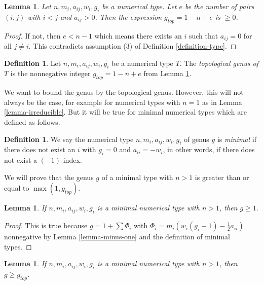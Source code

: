 \documentclass[10pt,a4paper]{amsart}
\theoremstyle{plain}
\newtheorem{lemma}[subsection]{Lemma}
\theoremstyle{definition}
\newtheorem{definition}[subsection]{Definition}
\theoremstyle{remark}
\numberwithin{equation}{subsection}
\begin{document}
\begin{lemma}
\label{lemma-top-genus}
Let $n, m_i, a_{ij}, w_i, g_i$ be a numerical type.
Let $e$ be the number of pairs $(i, j)$ with $i < j$ and $a_{ij} > 0$.
Then the expression $g_{top} = 1 - n + e$ is $\geq 0$.
\end{lemma}

\begin{proof}
If not, then $e < n - 1$ which means there exists an $i$ such that
$a_{ij} = 0$ for all $j \not = i$. This contradicts assumption
(3) of Definition \ref{definition-type}.
\end{proof}

\begin{definition}
\label{definition-top-genus}
Let $n, m_i, a_{ij}, w_i, g_i$ be a numerical type $T$. The
{\it topological genus of $T$} is the nonnegative integer
$g_{top} = 1 - n + e$ from Lemma \ref{lemma-top-genus}.
\end{definition}

\noindent
We want to bound the genus by the topological genus. However, this
will not always be the case, for example for numerical types
with $n = 1$ as in Lemma \ref{lemma-irreducible}. But it will
be true for minimal numerical types which are defined as follows.

\begin{definition}
\label{definition-type-minimal}
We say the numerical type $n, m_i, a_{ij}, w_i, g_i$ of genus $g$
is {\it minimal} if there does not exist an $i$
with $g_i = 0$ and $a_{ii} = -w_i$, in other words, if there
does not exist a $(-1)$-index.
\end{definition}

\noindent
We will prove that the genus $g$ of a minimal type with $n > 1$
is greater than or equal to $\max(1, g_{top})$.


\begin{lemma}
\label{lemma-non-irreducible-minimal-type-genus-at-least-one}
If $n, m_i, a_{ij}, w_i, g_i$ is a minimal numerical type
with $n > 1$, then $g \geq 1$.
\end{lemma}

\begin{proof}
This is true because $g = 1 + \sum \Phi_i$ with
$\Phi_i = m_i(w_i(g_i - 1) - \frac{1}{2} a_{ii})$ nonnegative
by Lemma \ref{lemma-minus-one} and the definition of minimal types.
\end{proof}

\begin{lemma}
\label{lemma-genus-nonnegative}
If $n, m_i, a_{ij}, w_i, g_i$ is a minimal numerical type
with $n > 1$, then $g \geq g_{top}$.
\end{lemma}
\end{document}
